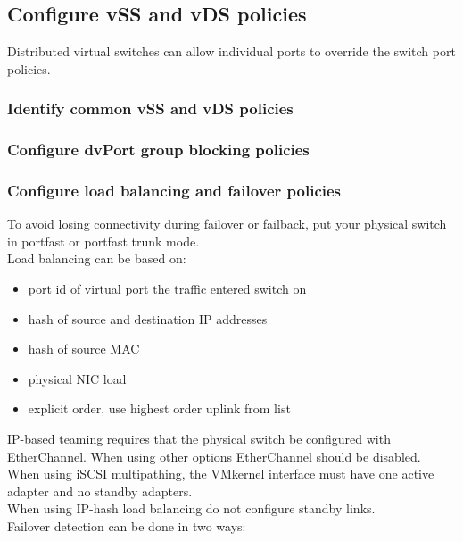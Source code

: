 \subsection{Configure vSS and vDS policies}

Distributed virtual switches can allow individual ports to override the switch
port policies.

\subsubsection{Identify common vSS and vDS policies}

\subsubsection{Configure dvPort group blocking policies}

\subsubsection{Configure load balancing and failover policies}

To avoid losing connectivity during failover or failback, put your physical
switch in portfast or portfast trunk mode.\\

Load balancing can be based on:

\begin{itemize}
\item port id of virtual port the traffic entered switch on
\item hash of source and destination IP addresses
\item hash of source MAC
\item physical NIC load
\item explicit order, use highest order uplink from list
\end{itemize}

IP-based teaming requires that the physical switch be configured with
EtherChannel. When using other options EtherChannel should be disabled.\\

When using iSCSI multipathing, the VMkernel interface must have one active
adapter and no standby adapters.\\

When using IP-hash load balancing do not configure standby links.\\

Failover detection can be done in two ways:

